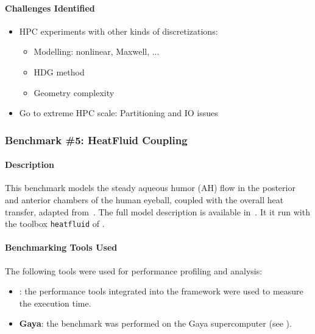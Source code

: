 \paragraph{Challenges Identified}

\begin{itemize}
\item HPC experiments with other kinds of discretizations:
  \begin{itemize}
  \item Modelling: nonlinear, Maxwell, ...
  \item HDG method
  \item Geometry complexity
  \end{itemize}
\item Go to extreme HPC scale: Partitioning and IO issues
\end{itemize}




\subsubsection{Benchmark \#5: HeatFluid Coupling}
\label{sec:WP1:Feelpp:benchmark4}

\newcommand{\vct}[1]{\vec{#1}}
\newcommand{\mat}[1]{\underline{\underline{#1}}}





\paragraph{Description}
This benchmark models the steady aqueous humor (AH) flow in the posterior and anterior chambers of the human eyeball, coupled with the overall heat transfer, adapted from~\cite{ooi_simulation_2008,kilgour_operator_2021}.
The full model description is available in~\cite{saigre_coupled_2024_abstract}.
It it run with the toolbox \texttt{heatfluid} of \Feelpp.


\paragraph{Benchmarking Tools Used}

The following tools were used for performance profiling and analysis:
\begin{itemize}
    \item \textbf{\Feelpp}: the performance tools integrated into the \Feelpp framework were used to measure the execution time.
    \item \textbf{Gaya}: the benchmark was performed on the Gaya supercomputer (see ).
\end{itemize}

